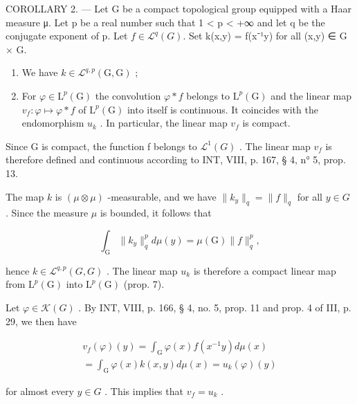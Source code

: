 COROLLARY 2. --- Let G be a compact topological group equipped with a Haar measure μ. Let p be a real number such that 1 \textless{} p \textless{} +∞ and let q be the conjugate exponent of p. Let \(f \in \mathcal{L}^{q}(G)\). Set k(x,y) = f(x⁻¹y) for all (x,y) ∈ G × G.

\begin{enumerate}
\def\labelenumi{\alph{enumi})}
\item
  We have \(k \in \mathcal{L}^{q,p}(\mathrm{G},\mathrm{G})\) ;
\item
  For \(\varphi \in \mathrm{L}^p (\mathrm{G})\) the convolution \(\varphi *f\) belongs to \(\mathrm{L}^p (\mathrm{G})\) and the linear map \(v_{f}\colon \varphi \mapsto \varphi *f\) of \(\mathrm{L}^p (\mathrm{G})\) into itself is continuous. It coincides with the endomorphism \(u_{k}\) . In particular, the linear map \(v_{f}\) is compact.
\end{enumerate}

Since G is compact, the function f belongs to \(\mathcal{L}^{1}(G)\) . The linear map \(v_{f}\) is therefore defined and continuous according to INT, VIII, p. 167, § 4, n° 5, prop. 13.

The map \(k\) is \((\mu \otimes \mu)\) -measurable, and we have \(\| k_y\| _q = \| f\| _q\) for all \(y\in G\) . Since the measure \(\mu\) is bounded, it follows that

\[
\int_ {\mathrm{G}} \| k _ {y} \| _ {q} ^ {p} d \mu (y) = \mu (\mathrm{G}) \| f \| _ {q} ^ {p},
\]

hence \(k \in \mathcal{L}^{q,p}(G, G)\) . The linear map \(u_{k}\) is therefore a compact linear map from \(\mathrm{L}^{p}(\mathrm{G})\) into \(\mathrm{L}^{p}(\mathrm{G})\) (prop. 7).

Let \(\varphi\in\mathcal{K}(G)\) . By INT, VIII, p. 166, § 4, no. 5, prop. 11 and prop. 4 of III, p. 29, we then have

\[
\begin{array}{c} v _ {f} (\varphi) (y) = \int_ {\mathrm{G}} \varphi (x) f (x ^ {- 1} y) d \mu (x) \\ = \int_ {\mathrm{G}} \varphi (x) k (x, y) d \mu (x) = u _ {k} (\varphi) (y) \end{array}
\]

for almost every \(y \in G\) . This implies that \(v_{f} = u_{k}\) .

